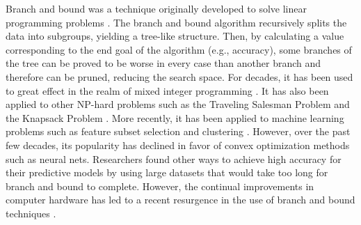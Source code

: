 Branch and bound was a technique originally developed to solve linear programming problems \cite{LandDo60}.
The branch and bound algorithm recursively splits the data into subgroups, yielding a tree-like structure.
Then, by calculating a value corresponding to the end goal of the algorithm (e.g., accuracy), some branches of the tree can be proved to be worse in every case than another branch and therefore can be pruned, reducing the search space.
For decades, it has been used to great effect in the realm of mixed integer programming \cite{LinderothSa99}.
It has also been applied to other NP-hard problems such as the Traveling Salesman Problem \cite{LittleMuSwKa63} and the Knapsack Problem \cite{Kolesar67}.
More recently, it has been applied to machine learning problems such as feature subset selection \cite{NarendraFu77} and clustering \cite{NarendraFu75}.
However, over the past few decades, its popularity has declined in favor of convex optimization methods such as neural nets.
Researchers found other ways to achieve high accuracy for their predictive models by using large datasets that would take too long for branch and bound to complete.
However, the continual improvements in computer hardware has led to a recent resurgence in the use of branch and bound techniques \cite{BertsimasKiMa16}.
